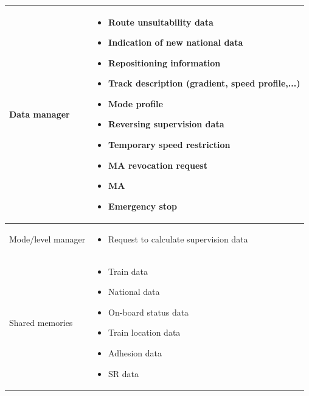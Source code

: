 \documentclass[nocc]{template/openetcs_report}
\begin{document}
\begin{longtable}{|l|l|}
				\hline	
									
					\begin{minipage}[t]{0.35\linewidth} Data manager	\end{minipage} 
				&	\begin{minipage}[t]{0.65\linewidth}
						\begin{itemize}
							\item Route unsuitability data
							\item Indication of new national data
							\item Repositioning information
							\item Track description (gradient, speed profile,...)
							\item Mode profile
							\item Reversing supervision data
							\item Temporary speed restriction
							\item MA revocation request
							\item MA
							\item Emergency stop
						\end{itemize}			
					\end{minipage} \\
				
				\hline	
													
					\begin{minipage}[t]{0.35\linewidth} Mode/level manager	\end{minipage} 
				&	\begin{minipage}[t]{0.65\linewidth}
						\begin{itemize}
							\item Request to calculate supervision data
						\end{itemize}			
					\end{minipage} \\
				
				\hline														
				
					\begin{minipage}[t]{0.35\linewidth} Shared memories	\end{minipage} 
				&	\begin{minipage}[t]{0.65\linewidth}
						\begin{itemize}
							\item Train data
							\item National data
							\item On-board status data
							\item Train location data
							\item Adhesion data
							\item SR data						
						\end{itemize}				
					\end{minipage} \\
				
				\hline	
			\end{longtable}	
\end{document}
